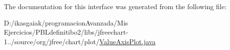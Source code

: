 The documentation for this interface was generated from the following file\+:\begin{DoxyCompactItemize}
\item 
D\+:/ikasgaiak/programacion\+Avanzada/\+Mis Ejercicios/\+P\+B\+Ldefinitibo2/libs/jfreechart-\/1../source/org/jfree/chart/plot/\mbox{\hyperlink{_value_axis_plot_8java}{Value\+Axis\+Plot.\+java}}\end{DoxyCompactItemize}
